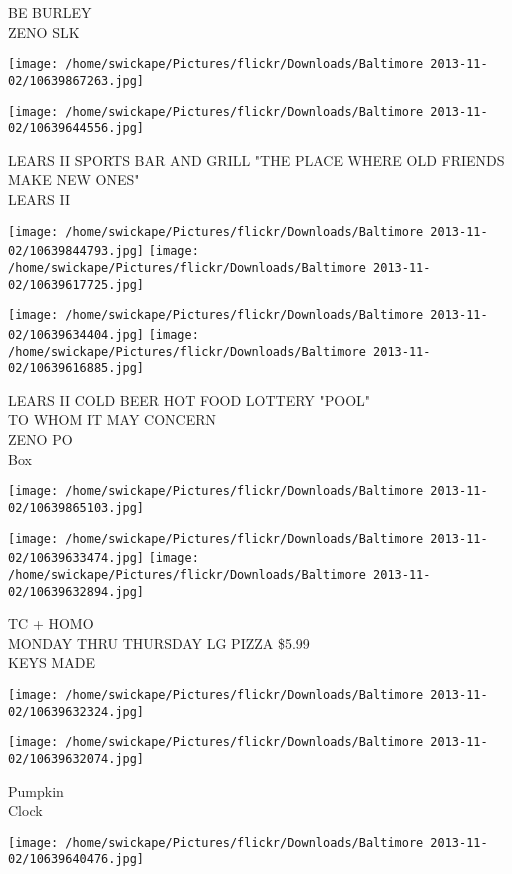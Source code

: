 \documentclass[10pt,letterpaper]{article}
\begin{document}
BE BURLEY\\
ZENO SLK
\pagebreak

\texttt{[image: /home/swickape/Pictures/flickr/Downloads/Baltimore 2013-11-02/10639867263.jpg]}

\vspace{0.25in}
\texttt{[image: /home/swickape/Pictures/flickr/Downloads/Baltimore 2013-11-02/10639644556.jpg]}

LEARS II SPORTS BAR AND GRILL "THE PLACE WHERE OLD FRIENDS MAKE NEW ONES"\\
LEARS II
\pagebreak

\texttt{[image: /home/swickape/Pictures/flickr/Downloads/Baltimore 2013-11-02/10639844793.jpg]}
\texttt{[image: /home/swickape/Pictures/flickr/Downloads/Baltimore 2013-11-02/10639617725.jpg]}

\texttt{[image: /home/swickape/Pictures/flickr/Downloads/Baltimore 2013-11-02/10639634404.jpg]}
\texttt{[image: /home/swickape/Pictures/flickr/Downloads/Baltimore 2013-11-02/10639616885.jpg]}

LEARS II COLD BEER HOT FOOD LOTTERY "POOL"\\
TO WHOM IT MAY CONCERN\\
ZENO PO\\
Box
\pagebreak

\texttt{[image: /home/swickape/Pictures/flickr/Downloads/Baltimore 2013-11-02/10639865103.jpg]}

\vspace{0.25in}
\texttt{[image: /home/swickape/Pictures/flickr/Downloads/Baltimore 2013-11-02/10639633474.jpg]}
\texttt{[image: /home/swickape/Pictures/flickr/Downloads/Baltimore 2013-11-02/10639632894.jpg]}

TC + HOMO\\
MONDAY THRU THURSDAY LG PIZZA \$5.99\\
KEYS MADE
\pagebreak

\texttt{[image: /home/swickape/Pictures/flickr/Downloads/Baltimore 2013-11-02/10639632324.jpg]}

\vspace{0.25in}
\texttt{[image: /home/swickape/Pictures/flickr/Downloads/Baltimore 2013-11-02/10639632074.jpg]}

Pumpkin\\
Clock
\pagebreak

\texttt{[image: /home/swickape/Pictures/flickr/Downloads/Baltimore 2013-11-02/10639640476.jpg]}
\end{document}
